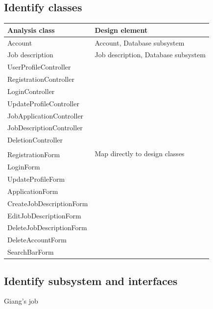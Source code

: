 \documentclass[a4paper]{article}
\begin{document}
    \subsection{Identify classes}
    \begin{center}
        \begin{tabular} { | l | l | }
            \hline
            \textbf{Analysis class} & \textbf{Design element} \\
            \hline
            Account & Account, Database subsystem \\
            \hline
            Job description & Job description, Database subsystem \\
            \hline
            UserProfileController & \multirow{16}{*}{Map directly to design classes} \\
            \cline{1-1}
            RegistrationController & \\
            \cline{1-1}
            LoginController & \\
            \cline{1-1}
            UpdateProfileController & \\
            \cline{1-1}
            JobApplicationController & \\
            \cline{1-1}
            JobDescriptionController & \\
            \cline{1-1}
            DeletionController & \\
            \cline{1-1} & \\
            RegistrationForm & \\
            \cline{1-1}
            LoginForm & \\
            \cline{1-1}
            UpdateProfileForm & \\
            \cline{1-1}
            ApplicationForm & \\
            \cline{1-1}
            CreateJobDescriptionForm & \\
            \cline{1-1}
            EditJobDescriptionForm & \\
            \cline{1-1}
            DeleteJobDescriptionForm & \\
            \cline{1-1}
            DeleteAccountForm & \\
            \cline{1-1}
            SearchBarForm & \\
            \hline
        \end{tabular}
    \end{center}

    \subsection{Identify subsystem and interfaces}
    Giang's job
\end{document}
